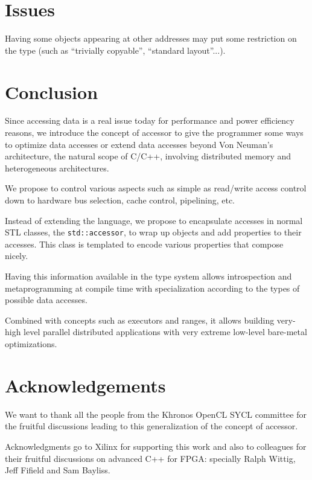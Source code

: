 \documentclass[a4paper]{article}
\begin{document}
\section{Issues}
\label{sec:issues}

Having some objects appearing at other addresses may put some
restriction on the type (such as ``trivially copyable'', ``standard
layout''...).


\section{Conclusion}
\label{sec:conclusion}

Since accessing data is a real issue today for performance and power
efficiency reasons, we introduce the concept of accessor to give the
programmer some ways to optimize data accesses or extend data accesses
beyond Von Neuman's architecture, the natural scope of C/C++,
involving distributed memory and heterogeneous architectures.

We propose to control various aspects such as simple as read/write
access control down to hardware bus selection, cache control,
pipelining, etc.

Instead of extending the language, we propose to encapsulate accesses
in normal STL classes, the \lstinline|std::accessor|, to wrap up
objects and add properties to their accesses. This class is templated
to encode various properties that compose nicely.

Having this information available in the type system allows
introspection and metaprogramming at compile time with specialization
according to the types of possible data accesses.

Combined with concepts such as executors and ranges, it allows
building very-high level parallel distributed applications with very
extreme low-level bare-metal optimizations.


\section*{Acknowledgements}
\label{sec:acknowledgements}

We want to thank all the people from the Khronos OpenCL SYCL committee
for the fruitful discussions leading to this generalization of the
concept of accessor.

Acknowledgments go to Xilinx for supporting this work and also to
colleagues for their fruitful discussions on advanced C++ for FPGA:
specially Ralph Wittig, Jeff Fifield and Sam Bayliss.
\end{document}
